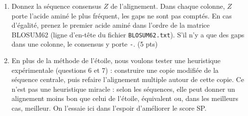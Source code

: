\documentclass[12pt]{article}
\begin{document}
\begin{enumerate}
	      \begin{itemize}
		      \item retirez d'abord les colonnes où les deux lignes ont un gap : elles valent 0 et ne comptent pas dans les runs ;
		      \item une colonne acide aminé/acide aminé vaut le score BLOSUM62 des deux acides aminés ;
		      \item un run est une suite maximale de gaps consécutifs \emph{dans la même ligne} (après le retrait ci-dessus) ; un run de $k$ gaps coûte $-(a + kb)$, y compris aux extrémités. Un gap dans une ligne suivi d'un gap dans l'autre ligne forme deux runs distincts.
	      \end{itemize}
	      Exemple : la paire \texttt{A---CG-} / \texttt{AW-Y-GK} devient \texttt{A--CG-} / \texttt{AWY-GK} après retrait de la colonne 3. Son score vaut $4 - (10+2) - (10+1) + 6 - (10+1) = -24$ : A/A, un run de 2 gaps dans la première ligne, un run de 1 gap dans la seconde, G/G, puis un run final de 1 gap. (5 pts)
	\item Donnez la séquence consensus $Z$ de l'alignement. Dans chaque colonne, $Z$ porte l'acide aminé le plus fréquent, les gaps ne sont pas comptés. En cas d'égalité, prenez le premier acide aminé dans l'ordre de la matrice BLOSUM62 (ligne d'en-tête du fichier \texttt{BLOSUM62.txt}). S'il n'y a que des gaps dans une colonne, le consensus y porte \texttt{-}. (5 pts)
	\item En plus de la méthode de l'étoile, nous voulons tester une heuristique expérimentale (questions 6 et 7) : construire une copie modifiée de la séquence centrale, puis refaire l'alignement multiple autour de cette copie. Ce n'est pas une heuristique miracle : selon les séquences, elle peut donner un alignement moins bon que celui de l'étoile, équivalent ou, dans les meilleurs cas, meilleur. On l'essaie ici dans l'espoir d'améliorer le score SP.


\end{enumerate}
\end{document}
